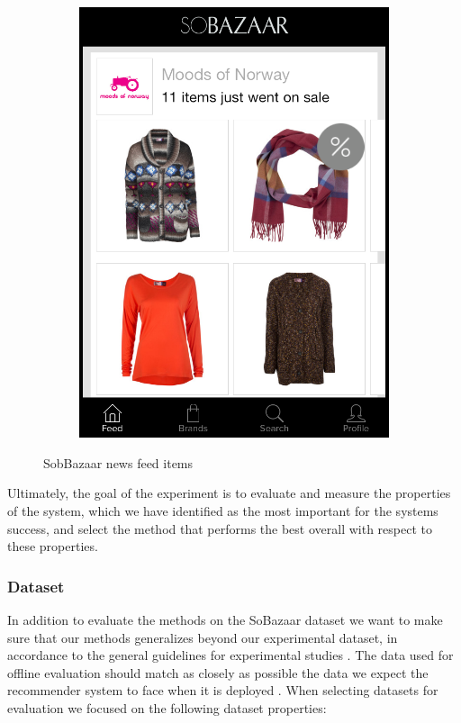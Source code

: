 \begin{figure}[H]
\begin{subfigure}[b]{.45\linewidth}
			\includegraphics[scale=0.25]{image/SoBazaarsale.png}
		\end{subfigure}
		\caption[Sobazaar News Feed - Version 0.5.1]{SobBazaar news feed items}
		\label{figure:sobazarfeed}
\end{figure}

Ultimately, the goal of the experiment is to evaluate and measure the properties
of the system, which we have identified as the most important for the systems success,
and select the method that performs the best overall with respect to these properties.

\subsubsection{Dataset}

In addition to evaluate the methods on the SoBazaar dataset we want to make sure that our
methods generalizes beyond our experimental dataset, in accordance to the general guidelines
for experimental studies \cite{Shani2011}. The data used for offline evaluation should match
as closely as possible the data we expect the recommender system to face when it is
deployed \cite{Gunawardana2009}. When selecting datasets for evaluation we focused on the
following dataset properties:

